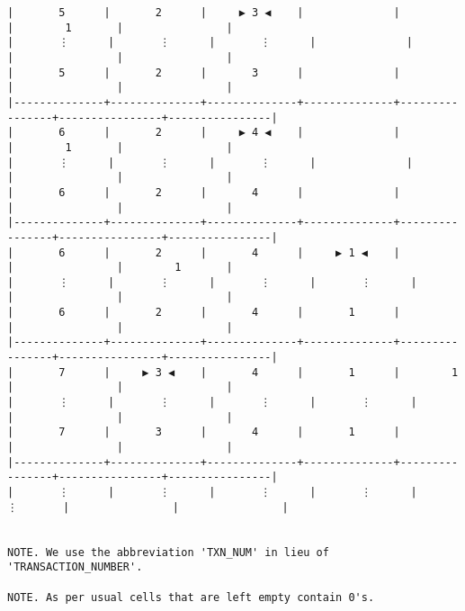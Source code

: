 \documentclass[varwidth=\maxdimen,margin=0.5cm,multi={verbatim}]{standalone}
\begin{document}
\begin{verbatim}
|       5      |       2      |     ▶ 3 ◀    |              |                |        1       |                |
|       ⋮      |       ⋮      |       ⋮      |              |                |                |                |
|       5      |       2      |       3      |              |                |                |                |
|--------------+--------------+--------------+--------------+----------------+----------------+----------------|
|       6      |       2      |     ▶ 4 ◀    |              |                |        1       |                |
|       ⋮      |       ⋮      |       ⋮      |              |                |                |                |
|       6      |       2      |       4      |              |                |                |                |
|--------------+--------------+--------------+--------------+----------------+----------------+----------------|
|       6      |       2      |       4      |     ▶ 1 ◀    |                |                |        1       |
|       ⋮      |       ⋮      |       ⋮      |       ⋮      |                |                |                |
|       6      |       2      |       4      |       1      |                |                |                |
|--------------+--------------+--------------+--------------+----------------+----------------+----------------|
|       7      |     ▶ 3 ◀    |       4      |       1      |        1       |                |                |
|       ⋮      |       ⋮      |       ⋮      |       ⋮      |                |                |                |
|       7      |       3      |       4      |       1      |                |                |                |
|--------------+--------------+--------------+--------------+----------------+----------------+----------------|
|       ⋮      |       ⋮      |       ⋮      |       ⋮      |        ⋮       |                |                |


NOTE. We use the abbreviation 'TXN_NUM' in lieu of 'TRANSACTION_NUMBER'.

NOTE. As per usual cells that are left empty contain 0's.

\end{verbatim}
\end{document}
